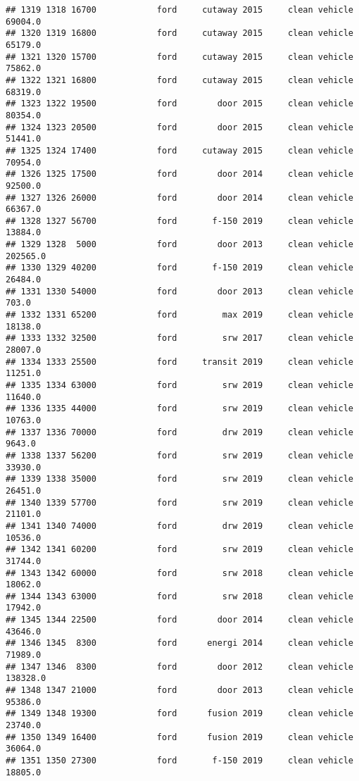 \documentclass[
]{article}
\begin{document}
\begin{verbatim}
## 1319 1318 16700            ford     cutaway 2015     clean vehicle   69004.0
## 1320 1319 16800            ford     cutaway 2015     clean vehicle   65179.0
## 1321 1320 15700            ford     cutaway 2015     clean vehicle   75862.0
## 1322 1321 16800            ford     cutaway 2015     clean vehicle   68319.0
## 1323 1322 19500            ford        door 2015     clean vehicle   80354.0
## 1324 1323 20500            ford        door 2015     clean vehicle   51441.0
## 1325 1324 17400            ford     cutaway 2015     clean vehicle   70954.0
## 1326 1325 17500            ford        door 2014     clean vehicle   92500.0
## 1327 1326 26000            ford        door 2014     clean vehicle   66367.0
## 1328 1327 56700            ford       f-150 2019     clean vehicle   13884.0
## 1329 1328  5000            ford        door 2013     clean vehicle  202565.0
## 1330 1329 40200            ford       f-150 2019     clean vehicle   26484.0
## 1331 1330 54000            ford        door 2013     clean vehicle     703.0
## 1332 1331 65200            ford         max 2019     clean vehicle   18138.0
## 1333 1332 32500            ford         srw 2017     clean vehicle   28007.0
## 1334 1333 25500            ford     transit 2019     clean vehicle   11251.0
## 1335 1334 63000            ford         srw 2019     clean vehicle   11640.0
## 1336 1335 44000            ford         srw 2019     clean vehicle   10763.0
## 1337 1336 70000            ford         drw 2019     clean vehicle    9643.0
## 1338 1337 56200            ford         srw 2019     clean vehicle   33930.0
## 1339 1338 35000            ford         srw 2019     clean vehicle   26451.0
## 1340 1339 57700            ford         srw 2019     clean vehicle   21101.0
## 1341 1340 74000            ford         drw 2019     clean vehicle   10536.0
## 1342 1341 60200            ford         srw 2019     clean vehicle   31744.0
## 1343 1342 60000            ford         srw 2018     clean vehicle   18062.0
## 1344 1343 63000            ford         srw 2018     clean vehicle   17942.0
## 1345 1344 22500            ford        door 2014     clean vehicle   43646.0
## 1346 1345  8300            ford      energi 2014     clean vehicle   71989.0
## 1347 1346  8300            ford        door 2012     clean vehicle  138328.0
## 1348 1347 21000            ford        door 2013     clean vehicle   95386.0
## 1349 1348 19300            ford      fusion 2019     clean vehicle   23740.0
## 1350 1349 16400            ford      fusion 2019     clean vehicle   36064.0
## 1351 1350 27300            ford       f-150 2019     clean vehicle   18805.0

\end{verbatim}
\end{document}

